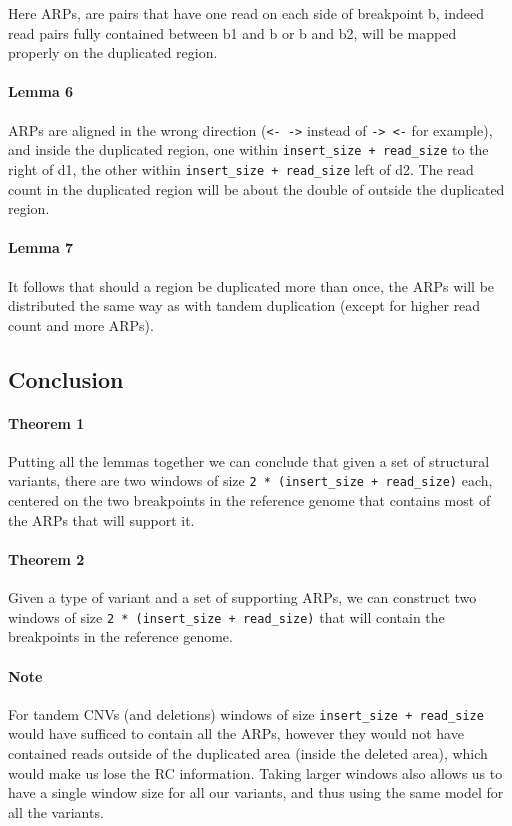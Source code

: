 \documentclass{article}
\begin{document}
Here ARPs, are pairs that have one read on each side of breakpoint b, indeed
read pairs fully contained between b1 and b or b and b2, will be mapped properly on the
duplicated region.

\paragraph{Lemma 6} ARPs are aligned in the wrong direction (\verb|<- ->| instead of \verb|-> <-| for example), and inside the duplicated region, one within \verb|insert_size + read_size| to the right of d1, the other within \verb|insert_size + read_size| left of d2.
The read count in the duplicated region will be about the double of outside the duplicated region.

\paragraph{Lemma 7} It follows that should a region be duplicated more than once, the ARPs will be distributed the same way as with tandem duplication (except for higher read count and more ARPs).

\subsection{Conclusion}

\paragraph{Theorem 1} Putting all the lemmas together we can conclude that given a set of structural variants, there are two windows of size \verb|2 * (insert_size + read_size)| each, centered on the two breakpoints in the reference genome that contains most of the ARPs that will support it.

\paragraph{Theorem 2} Given a type of variant and a set of supporting ARPs, we can construct two windows of size \verb|2 * (insert_size + read_size)| that will contain the breakpoints in the reference genome.

\paragraph{Note} For tandem CNVs (and deletions) windows of size \verb|insert_size + read_size| would have sufficed to contain all the ARPs, however they would not have contained reads outside of the duplicated area (inside the deleted area), which would make us lose the RC information.
Taking larger windows also allows us to have a single window size for all our variants, and thus using the same model for all the variants.
\end{document}
